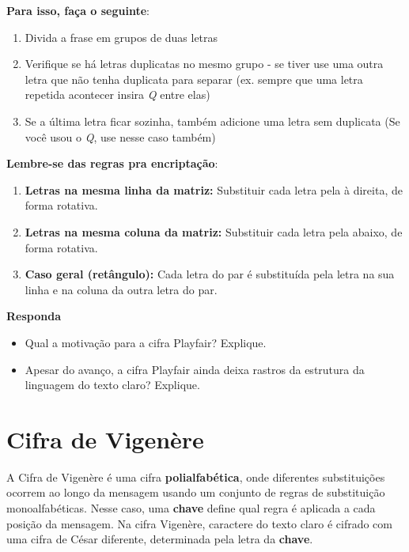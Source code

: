\hspace{1cm}

\textbf{Para isso, faça o seguinte}:
\begin{enumerate}
    \item Divida a frase em grupos de duas letras
    \item Verifique se há letras duplicatas no mesmo grupo - se tiver use uma outra letra que não tenha duplicata para separar (ex. sempre que uma letra repetida acontecer insira \textit{Q} entre elas)
    \item Se a última letra ficar sozinha, também adicione uma letra sem duplicata (Se você usou o \textit{Q}, use nesse caso também)
\end{enumerate}

\textbf{Lembre-se das regras pra encriptação}:
\begin{enumerate}

    \item \textbf{Letras na mesma linha da matriz:} Substituir cada letra pela à direita, de forma rotativa.


    \item \textbf{Letras na mesma coluna da matriz:} Substituir cada letra pela abaixo, de forma rotativa.

    \item \textbf{Caso geral (retângulo):} Cada letra do par é substituída pela letra na sua linha e na coluna da outra letra do par.



\end{enumerate}

\textbf{Responda}
\begin{itemize}
    \item Qual a motivação para a cifra Playfair? Explique.



    \item Apesar do avanço, a cifra Playfair ainda deixa rastros da estrutura da linguagem do texto claro? Explique.

\end{itemize}

\section{Cifra de Vigenère}

A Cifra de Vigenère é uma cifra \textbf{polialfabética}, onde diferentes substituições ocorrem ao longo da mensagem usando um conjunto de regras de substituição monoalfabéticas. Nesse caso, uma \textbf{chave} define qual regra é aplicada a cada posição da mensagem. Na cifra Vigenère, caractere do texto claro é cifrado com uma cifra de César diferente, determinada pela letra da \textbf{chave}.

